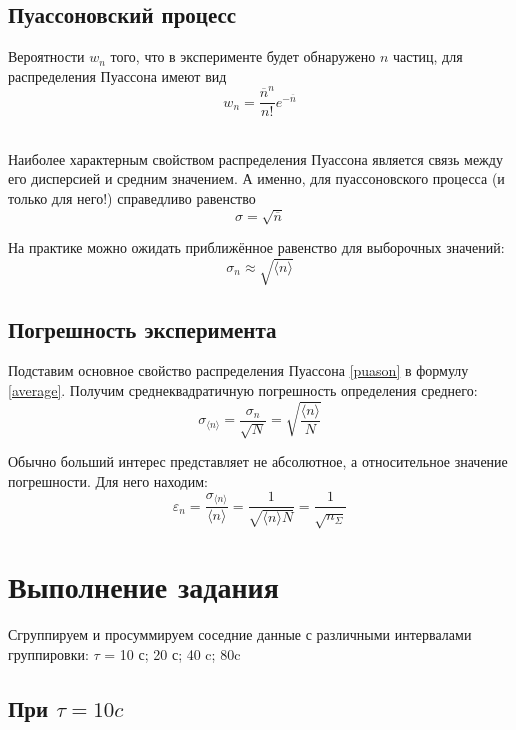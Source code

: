 \documentclass[a4paper, 12pt]{article}
\begin{document}
\subsection*{Пуассоновский процесс}
 
Вероятности $w_{n}$ того, что в эксперименте будет обнаружено $n$ частиц, для
распределения Пуассона имеют вид
\[w_{n}=\frac{\overline{n}^{n}}{n!}e^{-\overline{n}}\]\

Наиболее характерным свойством распределения Пуассона является связь между его дисперсией и средним значением. А именно, для пуассоновского процесса (и только для него!) справедливо равенство
\begin{equation}\label{puason}
    \sigma=\sqrt{\overline{n}}    
\end{equation}

На практике можно ожидать приближённое равенство для выборочных значений:
\[\sigma_{n}\approx\sqrt{\langle n\rangle}\]

\subsection*{Погрешность эксперимента}
Подставим основное свойство распределения Пуассона \eqref{puason} в формулу \eqref{average}. Получим среднеквадратичную погрешность определения среднего:
\[\sigma_{\langle n\rangle}=\frac{\sigma_{n}}{\sqrt{N}}=\sqrt{\frac{\langle n \rangle}{N}}\]

Обычно больший интерес представляет не абсолютное, а относительное значение погрешности. Для него находим:
\[\varepsilon_{n}=\frac{\sigma_{\langle n\rangle}}{\langle n\rangle}=\frac{1}{\sqrt{\langle n\rangle N}}=\frac{1}{\sqrt{n_{\Sigma}}}\]

\section*{Выполнение задания}

Сгруппируем и просуммируем соседние данные с различными интервалами группировки: $\tau$ = 10 с; 20 с; 40 c; 80c 

\vspace{5cm}
\subsection*{При $\tau=10 c$}
\end{document}
